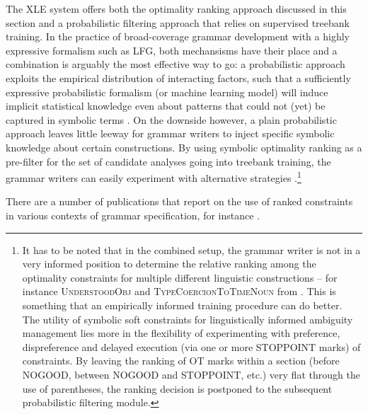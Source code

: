 \documentclass[output=paper,hidelinks]{langscibook}
\begin{document}
The XLE system offers both the optimality ranking approach discussed in this section and a probabilistic filtering approach that relies on supervised treebank training. In the practice of broad-coverage grammar development with a highly expressive formalism such as LFG, both mechansisms have their place and a combination is arguably the most effective way to go: a probabilistic approach exploits the empirical distribution of interacting factors, such that a sufficiently expressive probabilistic formalism (or machine learning model) will induce implicit statistical knowledge even about patterns that could not (yet) be captured in symbolic terms \citep[see, e.g.,][]{cahill-etal-2007-pruning,forst-2007-filling}. 
On the downside however, a plain probabilistic approach leaves little leeway for grammar writers to inject specific symbolic knowledge about certain constructions. By using symbolic optimality ranking as a pre-filter for the set of candidate analyses going into treebank training, the grammar writers can easily experiment with alternative strategies \citep{kingetal00}.\footnote{It has to be noted that in the combined setup, the grammar writer is not in a very informed position to determine the relative ranking among the optimality constraints for multiple different linguistic constructions -- for instance \textsc{UnderstoodObj} and \textsc{TypeCoercionToTimeNoun} from . This is something that an empirically informed training procedure can do better. The utility of symbolic soft constraints for linguistically informed ambiguity management lies more in the flexibility of experimenting with preference, dispreference and delayed execution (via one or more STOPPOINT marks) of constraints. By leaving the ranking of OT marks within a section (before NOGOOD, between NOGOOD and STOPPOINT, etc.) very flat through the use of parentheses, the ranking decision is postponed to the subsequent probabilistic filtering module.}


There are a number of publications that report on the use of ranked constraints in various contexts of grammar specification, for instance \citet{ZaenenCrouch2009,boegeletal09,Dione:Disambiguation}.

\end{document}
